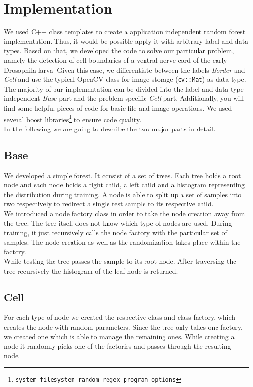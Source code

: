 \section{Implementation}
\label{sec:implementation}


We used C++ class templates to create a application independent random forest implementation. Thus, it would be possible apply it with arbitrary label and data types. Based on that, we developed the code to solve our particular problem, namely the detection of cell boundaries of a ventral nerve cord of the early Drosophila larva. Given this case, we differentiate between the labels \emph{Border} and \emph{Cell} and use the typical OpenCV class for image storage (\texttt{cv::Mat}) as data type.\\
The majority of our implementation can be divided into the label and data type independent \emph{Base} part and the problem specific \emph{Cell} part. Additionally, you will find some helpful pieces of code for basic file and image operations. We used several boost libraries\footnote{\texttt{system filesystem random regex program\_options}} to ensure code quality.\\
In the following we are going to describe the two major parts in detail.

\subsection{Base}
\label{subsec:base}
We developed a simple forest. It consist of a set of trees. Each tree holds a root node and each node holds a right child, a left child and a histogram representing the distribution during training. A node is able to split up a set of samples into two respectively to redirect a single test sample to its respective child. \\
We introduced a node factory class in order to take the node creation away from the tree. The tree itself does not know which type of nodes are used. During training, it just recursively calls the node factory with the particular set of samples. The node creation as well as the randomization takes place within the factory. \\
While testing the tree passes the sample to its root node. After traversing the tree recursively the histogram of the leaf node is returned. 

\subsection{Cell}
\label{subsec:base}
For each type of node we created the respective class and class factory, which creates the node with random parameters. Since the tree only takes one factory, we created one which is able to manage the remaining ones. While creating a node it randomly picks one of the factories and passes through the resulting node.


